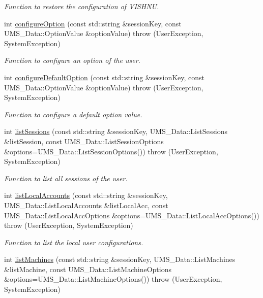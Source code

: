 \begin{DoxyCompactItemize}
\begin{DoxyCompactList}\small\item\em Function to restore the configuration of VISHNU. \item\end{DoxyCompactList}\item 
int \hyperlink{namespacevishnu_a5b88fcd36b780df012b2529fe3526ca1}{configureOption} (const std::string \&sessionKey, const UMS\_\-Data::OptionValue \&optionValue)  throw (UserException, SystemException)
\begin{DoxyCompactList}\small\item\em Function to configure an option of the user. \item\end{DoxyCompactList}\item 
int \hyperlink{namespacevishnu_a05878cbc7dbb3f5da87dbc32dd25ab78}{configureDefaultOption} (const std::string \&sessionKey, const UMS\_\-Data::OptionValue \&optionValue)  throw (UserException, SystemException)
\begin{DoxyCompactList}\small\item\em Function to configure a default option value. \item\end{DoxyCompactList}\item 
int \hyperlink{namespacevishnu_adaf9c8ca47f577cf1a0c9effe7bd9c52}{listSessions} (const std::string \&sessionKey, UMS\_\-Data::ListSessions \&listSession, const UMS\_\-Data::ListSessionOptions \&options=UMS\_\-Data::ListSessionOptions())  throw (UserException, SystemException)
\begin{DoxyCompactList}\small\item\em Function to list all sessions of the user. \item\end{DoxyCompactList}\item 
int \hyperlink{namespacevishnu_a2c892a93b3100eab8bd4de84f12178fa}{listLocalAccounts} (const std::string \&sessionKey, UMS\_\-Data::ListLocalAccounts \&listLocalAcc, const UMS\_\-Data::ListLocalAccOptions \&options=UMS\_\-Data::ListLocalAccOptions())  throw (UserException, SystemException)
\begin{DoxyCompactList}\small\item\em Function to list the local user configurations. \item\end{DoxyCompactList}\item 
int \hyperlink{namespacevishnu_a1173c380a74b87ee3f3e0651628ad800}{listMachines} (const std::string \&sessionKey, UMS\_\-Data::ListMachines \&listMachine, const UMS\_\-Data::ListMachineOptions \&options=UMS\_\-Data::ListMachineOptions())  throw (UserException, SystemException)

\end{DoxyCompactItemize}
